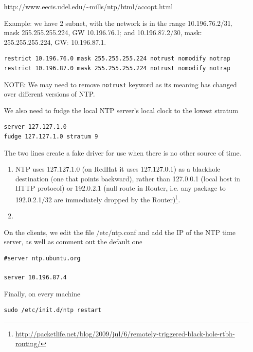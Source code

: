 \url{http://www.eecis.udel.edu/~mills/ntp/html/accopt.html}

Example: we have 2 subnet, with the network is in the range 10.196.76.2/31, mask
255.255.255.224, GW 10.196.76.1; and 10.196.87.2/30, mask: 255.255.255.224, GW:
10.196.87.1.
\begin{verbatim}
restrict 10.196.76.0 mask 255.255.255.224 notrust nomodify notrap
restrict 10.196.87.0 mask 255.255.255.224 notrust nomodify notrap
\end{verbatim}
NOTE: We may need to remove \verb!notrust! keyword as its meaning has changed
over different versions of NTP. 

We also need to fudge the local NTP server's local clock to the lowest stratum
\begin{verbatim}
server 127.127.1.0
fudge 127.127.1.0 stratum 9
\end{verbatim}
The two lines create a fake driver for use when there is no other
source of time.
\begin{enumerate}
  \item NTP uses 127.127.1.0 (on RedHat it uses 127.127.0.1) as a blackhole
destination (one that points backward), rather than 127.0.0.1 (local host in
HTTP protocol) or 192.0.2.1 (null route in Router, i.e. any package to
192.0.2.1/32 are immediately dropped by the
Router)\footnote{\url{http://packetlife.net/blog/2009/jul/6/remotely-triggered-black-hole-rtbh-routing/}}.
  \item  
\end{enumerate}
% 
% 

On the clients, we edit the file /etc/ntp.conf and add the IP of the NTP time
server, as well as comment out the default one
\begin{verbatim}
#server ntp.ubuntu.org

server 10.196.87.4
\end{verbatim}


Finally, on every machine
\begin{verbatim}
sudo /etc/init.d/ntp restart
\end{verbatim}

